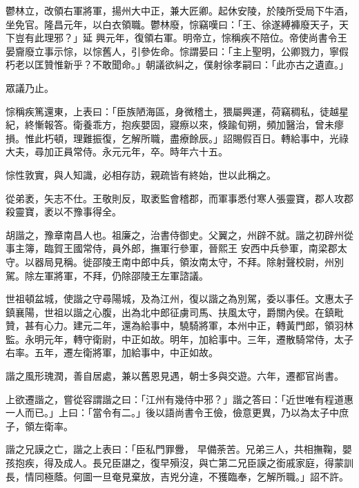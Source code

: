 \begin{pinyinscope}
 鬱林立，改領右軍將軍，揚州大中正，兼大匠卿。起休安陵，於陵所受局下牛酒，坐免官。隆昌元年，以白衣領職。鬱林廢，悰竊嘆曰：「王、徐遂縛褲廢天子，天下豈有此理邪？」延
 興元年，復領右軍。明帝立，悰稱疾不陪位。帝使尚書令王晏齎廢立事示悰，以悰舊人，引參佐命。悰謂晏曰：「主上聖明，公卿戮力，寧假朽老以匡贊惟新乎？不敢聞命。」朝議欲糾之，僕射徐孝嗣曰：「此亦古之遺直。」



 眾議乃止。



 悰稱疾篤還東，上表曰：「臣族陋海區，身微稽土，猥屬興運，荷竊稠私，徒越星紀，終慚報答。衛養乖方，抱疾嬰固，寢瘵以來，倏踰旬朔，頻加醫治，曾未瘳損。惟此朽頓，理難振復，乞解所職，盡療餘辰。」詔賜假百日。轉給事中，光祿大夫，尋加正員常侍。永元元年，卒。時年六十五。



 悰性敦實，與人知識，必相存訪，親疏皆有終始，世以此稱之。



 從弟袤，矢志不仕。王敬則反，取袤監會稽郡，而軍事悉付寒人張靈寶，郡人攻郡殺靈寶，袤以不豫事得全。



 胡諧之，豫章南昌人也。祖廉之，治書侍御史。父翼之，州辟不就。諧之初辟州從事主簿，臨賀王國常侍，員外郎，撫軍行參軍，晉熙王
 安西中兵參軍，南梁郡太守。以器局見稱。徙邵陵王南中郎中兵，領汝南太守，不拜。除射聲校尉，州別駕。除左軍將軍，不拜，仍除邵陵王左軍諮議。



 世祖頓盆城，使諧之守尋陽城，及為江州，復以諧之為別駕，委以事任。文惠太子鎮襄陽，世祖以諧之心腹，出為北中郎征虜司馬、扶風太守，爵關內侯。在鎮毗贊，甚有心力。建元二年，還為給事中，驍騎將軍，本州中正，轉黃門郎，領羽林監。永明元年，轉守衛尉，中正如故。明年，加給事中。三年，遷散騎常侍，太子右率。五年，遷左衛將軍，加給事中，中正如故。



 諧之風形瑰潤，善自居處，兼以舊恩見遇，朝士多與交遊。六年，遷都官尚書。



 上欲遷諧之，嘗從容謂諧之曰：「江州有幾侍中邪？」諧之答曰：「近世唯有程道惠一人而已。」上曰：「當令有二。」後以語尚書令王儉，儉意更異，乃以為太子中庶子，領左衛率。



 諧之兄謨之亡，諧之上表曰：「臣私門罪釁，
 早備荼苦。兄弟三人，共相撫鞠，嬰孩抱疾，得及成人。長兄臣諶之，復早殞沒，與亡第二兄臣謨之銜戚家庭，得蒙訓長，情同極蔭。何圖一旦奄見棄放，吉兇分違，不獲臨奉，乞解所職。」詔不許。




\end{pinyinscope}
